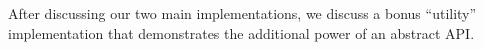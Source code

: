 
After discussing our two main implementations, we discuss
a bonus ``utility'' implementation that demonstrates
the additional power of an abstract API.












